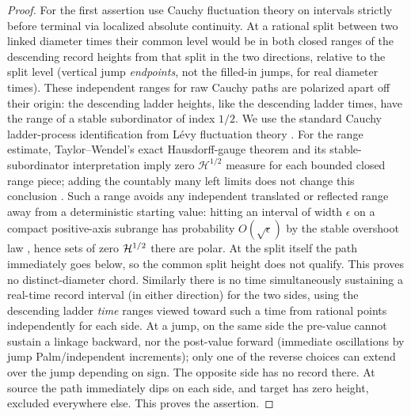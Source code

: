 \begin{proof}
For the first assertion use Cauchy fluctuation theory on intervals strictly before terminal via localized absolute continuity.
At a rational split between two linked diameter times their common level would be in both closed ranges of the descending record heights from that split in the two directions, relative to the split level (vertical jump \emph{endpoints}, not the filled-in jumps, for real diameter times).
These independent ranges for raw Cauchy paths are polarized apart off their origin: the descending ladder heights, like the descending ladder times, have the range of a stable subordinator of index \(1/2\).
We use the standard Cauchy ladder-process identification from Lévy fluctuation theory \citep[Chapters~VI and~VIII]{BertoinLevy}.  For the range estimate, Taylor--Wendel's exact Hausdorff-gauge theorem and its stable-subordinator interpretation imply zero \(\mathcal H^{1/2}\) measure for each bounded closed range piece; adding the countably many left limits does not change this conclusion \citep[Theorem~1 and Section~3]{TaylorWendel}.
Such a range avoids any independent translated or reflected range away from a deterministic starting value: hitting an interval of width \(\epsilon\) on a compact positive-axis subrange has probability \(O(\sqrt\epsilon)\) by the stable overshoot law \citep[Lemma~1]{TaylorWendel}, hence sets of zero \({\cal H}^{1/2}\) there are polar.
At the split itself the path immediately goes below, so the common split height does not qualify.
This proves no distinct-diameter chord.
Similarly there is no time simultaneously sustaining a real-time record interval (in either direction) for the two sides, using the descending ladder \emph{time} ranges viewed toward such a time from rational points independently for each side.
At a jump, on the same side the pre-value cannot sustain a linkage backward, nor the post-value forward (immediate oscillations by jump Palm/independent increments); only one of the reverse choices can extend over the jump depending on sign.
The opposite side has no record there.
At source the path immediately dips on each side, and target has zero height, excluded everywhere else.
This proves the assertion.



\end{proof}
